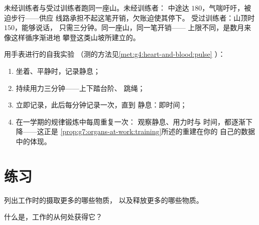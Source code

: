 \begin{example}\label{ex:g7:organs-at-work:runners}
未经训练者与受过训练者跑同一座山。未经训练者：
中途达 $180$，气喘吁吁，被迫步行——供应
线路承担不起这笔开销，欠账迫使其停下。
受过训练者：山顶时 $150$，能够说话，
只需三分钟。同一座山，同一笔开销——
上限不同，是数月来像这样循序渐进地
攀登这类山坡所建立的。
\end{example}

\begin{method}[读懂自己的机器]\label{met:g7:organs-at-work:read}
用手表进行的自我实验
（测的方法见\cref{met:g4:heart-and-blood:pulse}
）：
\begin{enumerate}
  \item 坐着、平静时，记录静息；
  \item 持续用力三分钟——上下踏台阶、
        跳绳；
  \item 立即记录，此后每分钟记录一次，直到
        静息：即时间；
  \item 在一学期的规律锻炼中每周重复一次：
        观察静息、用力时与
        时间，都逐渐下降——这正是
        \cref{prop:g7:organs-at-work:training}所述的重建在你的
        自己的数据中的体现。
\end{enumerate}
\end{method}

\section{练习}

\begin{exercise}[$\star$]\label{exo:g7:organs-at-work:1}
列出工作时的摄取更多的哪些物质，
以及释放更多的哪些物质。
\end{exercise}

\begin{exercise}[$\star$]\label{exo:g7:organs-at-work:2}
什么是，工作的从何处获得它？
\end{exercise}

